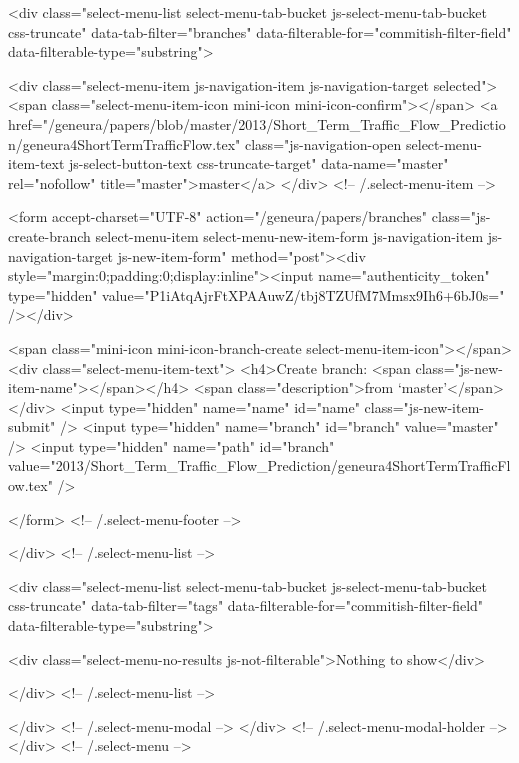           <div class="select-menu-list select-menu-tab-bucket js-select-menu-tab-bucket css-truncate" data-tab-filter="branches" data-filterable-for="commitish-filter-field" data-filterable-type="substring">


              <div class="select-menu-item js-navigation-item js-navigation-target selected">
                <span class="select-menu-item-icon mini-icon mini-icon-confirm"></span>
                <a href="/geneura/papers/blob/master/2013/Short_Term_Traffic_Flow_Prediction/geneura4ShortTermTrafficFlow.tex" class="js-navigation-open select-menu-item-text js-select-button-text css-truncate-target" data-name="master" rel="nofollow" title="master">master</a>
              </div> <!-- /.select-menu-item -->

              <form accept-charset="UTF-8" action="/geneura/papers/branches" class="js-create-branch select-menu-item select-menu-new-item-form js-navigation-item js-navigation-target js-new-item-form" method="post"><div style="margin:0;padding:0;display:inline"><input name="authenticity_token" type="hidden" value="P1iAtqAjrFtXPAAuwZ/tbj8TZUfM7Mmsx9Ih6+6bJ0s=" /></div>


                <span class="mini-icon mini-icon-branch-create select-menu-item-icon"></span>
                <div class="select-menu-item-text">
                  <h4>Create branch: <span class="js-new-item-name"></span></h4>
                  <span class="description">from ‘master’</span>
                </div>
                <input type="hidden" name="name" id="name" class="js-new-item-submit" />
                <input type="hidden" name="branch" id="branch" value="master" />
                <input type="hidden" name="path" id="branch" value="2013/Short_Term_Traffic_Flow_Prediction/geneura4ShortTermTrafficFlow.tex" />

              </form> <!-- /.select-menu-footer -->


          </div> <!-- /.select-menu-list -->


          <div class="select-menu-list select-menu-tab-bucket js-select-menu-tab-bucket css-truncate" data-tab-filter="tags" data-filterable-for="commitish-filter-field" data-filterable-type="substring">


            <div class="select-menu-no-results js-not-filterable">Nothing to show</div>

          </div> <!-- /.select-menu-list -->

        </div> <!-- /.select-menu-modal -->
      </div> <!-- /.select-menu-modal-holder -->
    </div> <!-- /.select-menu -->

